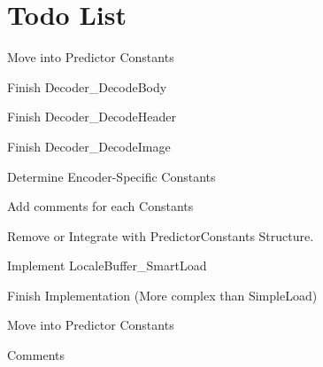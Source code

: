 \chapter{Todo List}
\hypertarget{todo}{}\label{todo}

\begin{DoxyRefList}
\item[Global \doxylink{sample__representative_8h_aa25f2ddef46c2c5466643b137580700a}{damping} \mbox{[}\mbox{]}]\label{todo__todo000014}%
%
Move into Predictor Constants  
\item[File \doxylink{decoder_8h}{decoder.h} ]\label{todo__todo000006}%
%
Finish Decoder\+\_\+\+Decode\+Body 



Finish Decoder\+\_\+\+Decode\+Header 



Finish Decoder\+\_\+\+Decode\+Image  
\item[File \doxylink{encoder__constants_8h}{encoder\+\_\+constants.h} ]\label{todo__todo000001}%
%
Determine Encoder-\/\+Specific Constants 



Add comments for each Constants 
\item[Global \doxylink{predictor_8h_a4e6f06fbe7f6b462853492abfbd0bec2}{kC} ]\label{todo__todo000013}%
%
Remove or Integrate with Predictor\+Constants Structure.  
\item[File \doxylink{locale__buffer_8h}{locale\+\_\+buffer.h} ]\label{todo__todo000007}%
%
Implement Locale\+Buffer\+\_\+\+Smart\+Load  
\item[Global \doxylink{locale__buffer_8h_af3d15cfc9f56982d6e407e18dae59cf6}{Locale\+Buffer\+\_\+\+Smart\+Load} (\doxylink{struct_locale_buffer}{Locale\+Buffer} \texorpdfstring{$\ast$}{*}buf, image \texorpdfstring{$\ast$}{*}h\+IMG, \doxylink{structdim3}{dim3} index)]\label{todo__todo000008}%
%
Finish Implementation (More complex than Simple\+Load)  
\item[Global \doxylink{sample__representative_8h_a0ed063d2db07cb63fecfb70cffec43f1}{offset} \mbox{[}\mbox{]}]\label{todo__todo000015}%
%
Move into Predictor Constants  
\item[File \doxylink{predictor__constants_8h}{predictor\+\_\+constants.h} ]\label{todo__todo000002}%
%
Comments 




\end{DoxyRefList}
